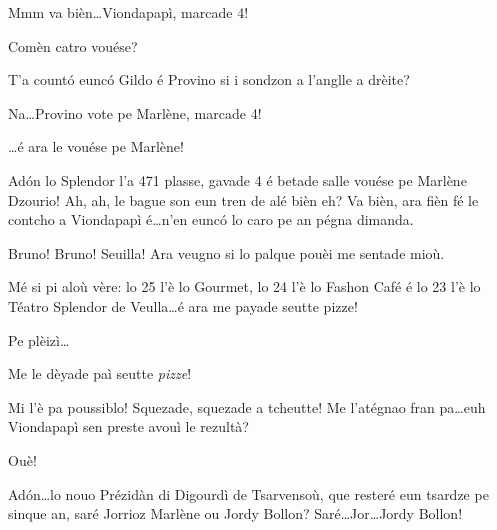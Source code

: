 \begin{drama}
\Brunospeaks Mmm va bièn\ldots Viondapapì, marcade 4!

\Jordyspeaks Comèn catro vouése?

\Noteospeaks {} T'a count\'o eunc\'o Gildo é Provino si i sondzon a l'anglle a drèite?

\Brunospeaks Na\ldots Provino vote pe Marlène, marcade 4!

\Brunospeaks \ldots é ara le vouése pe Marlène!


\Brunospeaks  {} Ad\'on lo Splendor l'a 471 plasse, gavade 4 é betade salle vouése pe Marlène Dzourio!  Ah, ah, le bague son eun tren de alé bièn eh?  Va bièn, ara fièn fé le contcho a Viondapapì é\ldots n'en eunc\'o lo caro pe an pégna dimanda.


\Fattorinospeaks Bruno! Bruno! Seuilla! Ara veugno si lo palque pouèi me sentade mioù.


\Fattorinospeaks Mé si pi aloù vère: lo 25 l’è lo Gourmet, lo 24 l'è lo Fashon Café é lo 23 l’è lo Téatro Splendor de Veulla\ldots é ara me payade seutte pizze!

\Brunospeaks {} Pe plèizì\ldots


\Fattorinospeaks {} Me le dèyade paì seutte \textit{pizze}!

\Brunospeaks {} Mi l'è pa poussiblo! Squezade, squezade a tcheutte! Me l'atégnao fran pa\ldots euh Viondapapì sen preste avouì le rezultà?

\Noteospeaks  Ouè!



\Brunospeaks{} Ad\'on\ldots lo nouo Prézidàn di Digourdì de Tsarvensoù, que resteré eun tsardze pe sinque an, saré Jorrioz Marlène ou Jordy Bollon? Saré\ldots Jor\ldots Jordy Bollon!


\end{drama}
